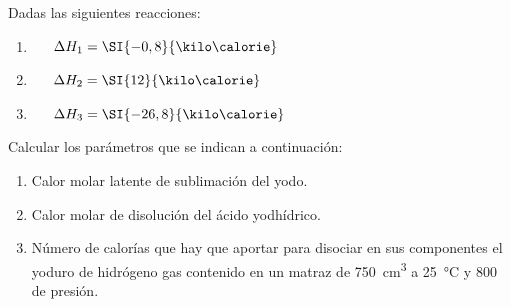 Dadas las siguientes reacciones:
\begin{enumerate}
    \item {}~~~$\Delta H_1 = \SI{-0,8}{\kilo\calorie}$
    \item {}~~~$\Delta H_2 = \SI{12}{\kilo\calorie}$
    \item {}~~~$\Delta H_3 = \SI{-26,8}{\kilo\calorie}$
\end{enumerate}
Calcular los parámetros que se indican a continuación:
\begin{enumerate}[label={\alph*)},font={\color{red!50!black}\bfseries}]
    \item Calor molar latente de sublimación del yodo.
    \item Calor molar de disolución del ácido yodhídrico.
    \item Número de calorías que hay que aportar para disociar en sus componentes el yoduro de hidrógeno gas contenido en un matraz de \SI{750}{\cubic\centi\meter} a \SI{25}{\celsius} y \SI{800}{\torr} de presión.
\end{enumerate}
